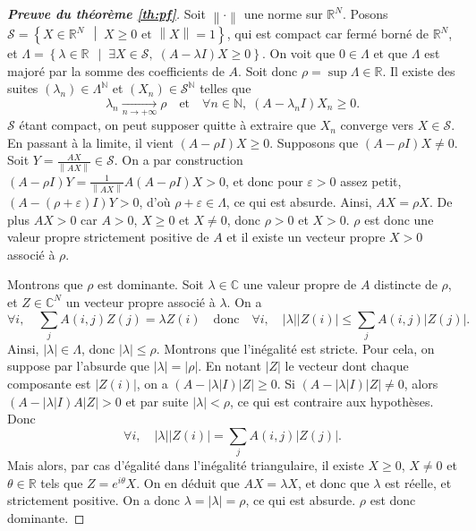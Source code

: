 \documentclass[11pt]{article}
\newcommand{\ens}[3][\middle|]{
    \left\{#2 \;\, #1 \; #3\right\}
}
\newcommand{\R}{\mathbb{R}}
\newcommand{\N}{\mathbb{N}}
\newcommand{\C}{\mathbb{C}}
\newcommand{\module}[1]{\left\lvert #1 \right\rvert}
\newcommand{\norm}[1]{\left\lVert #1 \right\rVert}
\renewcommand{\leq}{\leqslant}
\renewcommand{\geq}{\geqslant}
\theoremstyle{plain}
\begin{document}
\begin{proof}[\emph{\textbf{Preuve du théorème \ref{th:pf}}}]
    Soit $\norm{\cdot}$ une norme sur $\R^{N}$. Posons $\mathcal{S} = \ens{X \in \R^N}{X \geq 0 \text{ et } \norm{X} = 1}$, qui est compact car fermé borné de $\R^N$, et $\Lambda = \ens{\lambda \in \R}{\exists X \in \mathcal{S}, \; (A - \lambda I)X \geq 0}$. On voit que $0 \in \Lambda$ et que $\Lambda$ est majoré par la somme des coefficients de $A$. Soit donc $\rho = \sup \Lambda \in \R$. Il existe des suites $(\lambda_n) \in \Lambda^{\N}$ et $(X_n) \in \mathcal{S}^{\N}$ telles que
    $$\lambda_n \xrightarrow[n \to + \infty]{} \rho \quad \text{et} \quad \forall n \in \N, \; (A - \lambda_n I) X_n \geq 0.$$
    $\mathcal{S}$ étant compact, on peut supposer quitte à extraire que $X_n$ converge vers $X \in \mathcal{S}$. En passant à la limite, il vient $(A - \rho I)X \geq 0$. Supposons que $(A - \rho I)X \neq 0$. Soit $Y = \frac{AX}{\norm{AX}} \in \mathcal{S}$. On a par construction $(A - \rho I)Y = \frac{1}{\norm{AX}}A(A - \rho I)X > 0$, et donc pour $\varepsilon > 0$ assez petit, $(A - (\rho + \varepsilon) I)Y > 0$, d'où $\rho + \varepsilon \in \Lambda$, ce qui est absurde. Ainsi, $AX = \rho X$. De plus $AX > 0$ car $A > 0$, $X \geq 0$ et $X \neq 0$, donc $\rho > 0$ et $X > 0$. $\rho$ est donc une valeur propre strictement positive de $A$ et il existe un vecteur propre $X > 0$ associé à $\rho$.

    Montrons que $\rho$ est dominante. Soit $\lambda \in \C$ une valeur propre de $A$ distincte de $\rho$, et $Z \in \C^N$ un vecteur propre associé à $\lambda$. On a
    $$\forall i, \quad \sum_j A(i,j)Z(j) = \lambda Z(i) \quad \text{donc} \quad \forall i, \quad  \module{\lambda}\module{Z(i)} \leq \sum_j A(i,j) \module{Z(j)}.$$ Ainsi, $\module{\lambda} \in \Lambda$, donc $\module{\lambda} \leq \rho$. Montrons que l'inégalité est stricte. Pour cela, on suppose par l'absurde que $\module{\lambda} = \module{\rho}$. En notant $\module{Z}$ le vecteur dont chaque composante est $\module{Z(i)}$, on a $(A - \module{\lambda}I)\module{Z} \geq 0$. Si $(A - \module{\lambda}I)\module{Z} \neq 0$, alors $(A - \module{\lambda}I)A\module{Z} > 0$ et par suite $\module{\lambda} < \rho$, ce qui est contraire aux hypothèses. Donc 
    $$\forall i, \quad \module{\lambda}\module{Z(i)} = \sum_j A(i,j) \module{Z(j)}.$$ Mais alors, par cas d'égalité dans l'inégalité triangulaire, il existe $X \geq 0$, $X \neq 0$ et $\theta \in \R$ tels que $Z = e^{i\theta}X$. On en déduit que $AX = \lambda X$, et donc que $\lambda$ est réelle, et strictement positive. On a donc $\lambda = \module{\lambda} = \rho$, ce qui est absurde. $\rho$ est donc dominante.


\end{proof}
\end{document}

